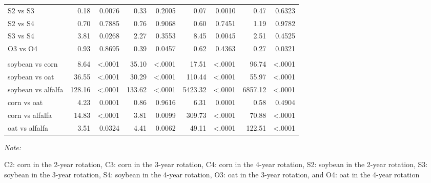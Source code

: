 \documentclass[
]{article}
\begin{document}
\begin{landscape}
\begin{table}
\begin{threeparttable}
\begin{tabular}[t]{lrrr>{}r|rrrr}
\hspace{1em}S2 vs S3 & 0.18 & 0.0076 & 0.33 & 0.2005 & 0.07 & 0.0010 & 0.47 & 0.6323\\
\hspace{1em}S2 vs S4 & 0.70 & 0.7885 & 0.76 & 0.9068 & 0.60 & 0.7451 & 1.19 & 0.9782\\
\hspace{1em}S3 vs S4 & 3.81 & 0.0268 & 2.27 & 0.3553 & 8.45 & 0.0045 & 2.51 & 0.4525\\
\hspace{1em}O3 vs O4 & 0.93 & 0.8695 & 0.39 & 0.0457 & 0.62 & 0.4363 & 0.27 & 0.0321\\
\addlinespace[0.3em]
\multicolumn{9}{l}{\textbf{(B) - Crop species effects}}\\
\hspace{1em}soybean vs corn & 8.64 & <.0001 & 35.10 & <.0001 & 17.51 & <.0001 & 96.74 & <.0001\\
\hspace{1em}soybean vs oat & 36.55 & <.0001 & 30.29 & <.0001 & 110.44 & <.0001 & 55.97 & <.0001\\
\hspace{1em}soybean vs alfalfa & 128.16 & <.0001 & 133.62 & <.0001 & 5423.32 & <.0001 & 6857.12 & <.0001\\
\hspace{1em}corn vs oat & 4.23 & 0.0001 & 0.86 & 0.9616 & 6.31 & 0.0001 & 0.58 & 0.4904\\
\hspace{1em}corn vs alfalfa & 14.83 & <.0001 & 3.81 & 0.0099 & 309.73 & <.0001 & 70.88 & <.0001\\
\hspace{1em}oat vs alfalfa & 3.51 & 0.0324 & 4.41 & 0.0062 & 49.11 & <.0001 & 122.51 & <.0001\\
\bottomrule
\end{tabular}
\begin{tablenotes}[para]
\item \textit{Note: } 
\item C2: corn in the 2-year rotation, C3: corn in the 3-year rotation, C4: corn in the 4-year rotation, S2: soybean in the 2-year rotation, S3: soybean in the 3-year rotation, S4: soybean in the 4-year rotation, O3: oat in the 3-year rotation, and O4: oat in the 4-year rotation
\end{tablenotes}
\end{threeparttable}
\end{table}
\end{landscape}
\end{document}
